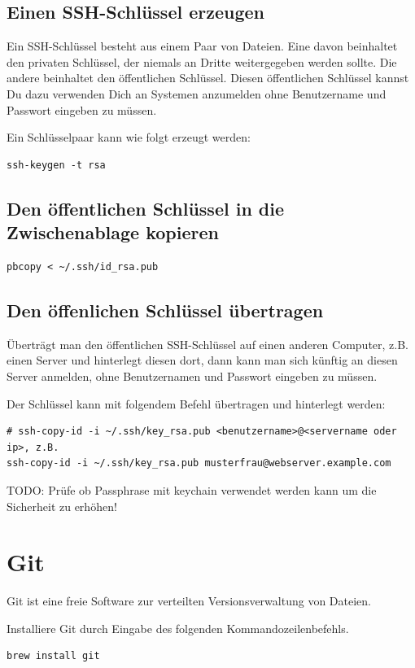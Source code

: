 \documentclass[]{article}
\begin{document}
\subsection{Einen SSH-Schlüssel erzeugen}
Ein SSH-Schlüssel besteht aus einem Paar von Dateien. Eine davon beinhaltet den privaten Schlüssel, der niemals an Dritte weitergegeben werden sollte. Die andere beinhaltet den öffentlichen Schlüssel. Diesen öffentlichen Schlüssel kannst Du dazu verwenden Dich an Systemen anzumelden ohne Benutzername und Passwort eingeben zu müssen.

Ein Schlüsselpaar kann wie folgt erzeugt werden:
\begin{verbatim}
ssh-keygen -t rsa
\end{verbatim}

\subsection{Den öffentlichen Schlüssel in die Zwischenablage kopieren}
\begin{verbatim}
pbcopy < ~/.ssh/id_rsa.pub
\end{verbatim}

\subsection{Den öffenlichen Schlüssel übertragen}
Überträgt man den öffentlichen SSH-Schlüssel auf einen anderen Computer, z.B. einen Server und hinterlegt diesen dort, dann kann man sich künftig an diesen Server anmelden, ohne Benutzernamen und Passwort eingeben zu müssen.

Der Schlüssel kann mit folgendem Befehl übertragen und hinterlegt werden:
\begin{verbatim}
# ssh-copy-id -i ~/.ssh/key_rsa.pub <benutzername>@<servername oder ip>, z.B.
ssh-copy-id -i ~/.ssh/key_rsa.pub musterfrau@webserver.example.com
\end{verbatim}

TODO: Prüfe ob Passphrase mit keychain verwendet werden kann um die Sicherheit zu erhöhen!

\section{Git}
Git ist eine freie Software zur verteilten Versionsverwaltung von Dateien.

Installiere Git durch Eingabe des folgenden Kommandozeilenbefehls.
\begin{verbatim}
brew install git
\end{verbatim}
\end{document}
